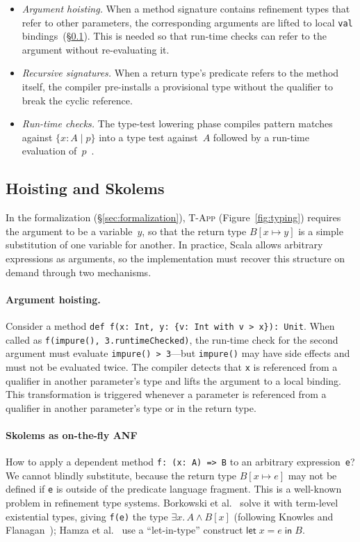 \documentclass[acmsmall]{acmart}
\begin{document}
\begin{itemize}
  \item \emph{Argument hoisting.} When a method signature contains refinement types that refer to other parameters, the corresponding arguments are lifted to local \lstinline!val! bindings~(\S\ref{sec:anf}). This is needed so that run-time checks can refer to the argument without re-evaluating it.
  \item \emph{Recursive signatures.} When a return type's predicate refers to the method itself, the compiler pre-installs a provisional type without the qualifier to break the cyclic reference.
  \item \emph{Run-time checks.} The type-test lowering phase compiles pattern matches against $\{x : A \mid p\}$ into a type test against~$A$ followed by a run-time evaluation of~$p$~\cite{quentin,valentin}.
\end{itemize}

\subsection{Hoisting and Skolems}\label{sec:anf}

In the formalization (\S\ref{sec:formalization}), \textsc{T-App} (Figure~\ref{fig:typing}) requires the argument to be a variable~$y$, so that the return type $B[x \mapsto y]$ is a simple substitution of one variable for another. In practice, Scala allows arbitrary expressions as arguments, so the implementation must recover this structure on demand through two mechanisms.

\paragraph{Argument hoisting.}
Consider a method \lstinline!def f(x: Int, y: {v: Int with v > x}): Unit!. When called as \lstinline!f(impure(), 3.runtimeChecked)!, the run-time check for the second argument must evaluate \lstinline!impure() > 3!---but \lstinline!impure()! may have side effects and must not be evaluated twice. The compiler detects that \lstinline!x! is referenced from a qualifier in another parameter's type and lifts the argument to a local binding. This transformation is triggered whenever a parameter is referenced from a qualifier in another parameter's type or in the return type.

\paragraph{Skolems as on-the-fly ANF}
How to apply a dependent method \lstinline!f: (x: A) => B! to an arbitrary expression~\lstinline!e!? We cannot blindly substitute, because the return type $B[x \mapsto e]$ may not be defined if \lstinline!e! is outside of the predicate language fragment. This is a well-known problem in refinement type systems. Borkowski et al.~\cite{borkowski2022} solve it with term-level existential types, giving \lstinline!f(e)! the type $\exists x.\, A \land B[x]$ (following Knowles and Flanagan~\cite{flanagan2006}); Hamza et al.~\cite{hamza2019} use a ``let-in-type'' construct $\mathsf{let}\; x = e\;\mathsf{in}\; B$.
\end{document}
